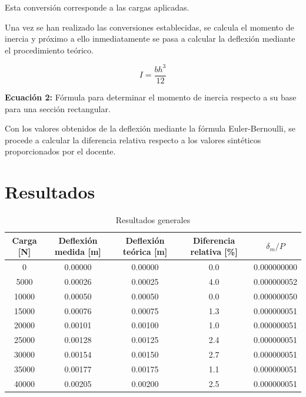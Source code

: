 \documentclass[12pt,a4paper]{article}
\begin{document}
Esta conversión corresponde a las cargas aplicadas.

Una vez se han realizado las conversiones establecidas, se calcula el
momento de inercia y próximo a ello inmediatamente se pasa a calcular la
deflexión mediante el procedimiento teórico.

\begin{equation}
I=\frac{bh^3}{12}
\label{eq:inercia}
\end{equation}

\noindent
\textbf{Ecuación 2:} Fórmula para determinar el momento de inercia respecto
a su base para una sección rectangular.

Con los valores obtenidos de la deflexión mediante la fórmula
Euler-Bernoulli, se procede a calcular la diferencia relativa respecto a los
valores sintéticos proporcionados por el docente.

\section{Resultados}

\begin{table}[H]
\centering
\caption{Resultados generales}
\label{tab:resultados}
\begin{tabular}{S[table-format=5.0]
                S[table-format=1.5]
                S[table-format=1.5]
                S[table-format=1.1]
                S[table-format=1.9]}
\toprule
{Carga [N]} & {Deflexión medida [m]} & {Deflexión teórica [m]} &
{Diferencia relativa [\%]} & {$\delta_m/P$} \\
     & 0.00000 & 0.00000 & 0.0 & 0.000000000 \\
5000  & 0.00026 & 0.00025 & 4.0 & 0.000000052 \\
10000 & 0.00050 & 0.00050 & 0.0 & 0.000000050 \\
15000 & 0.00076 & 0.00075 & 1.3 & 0.000000051 \\
20000 & 0.00101 & 0.00100 & 1.0 & 0.000000051 \\
25000 & 0.00128 & 0.00125 & 2.4 & 0.000000051 \\
30000 & 0.00154 & 0.00150 & 2.7 & 0.000000051 \\
35000 & 0.00177 & 0.00175 & 1.1 & 0.000000051 \\
40000 & 0.00205 & 0.00200 & 2.5 & 0.000000051 \\
\bottomrule
\end{tabular}
\end{table}
\end{document}
